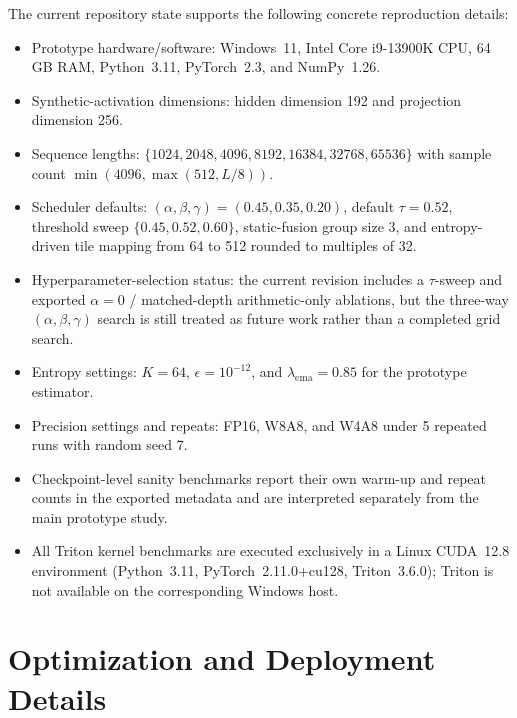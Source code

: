 The current repository state supports the following concrete reproduction details:
\begin{itemize}
  \item Prototype hardware/software: Windows~11, Intel Core i9-13900K CPU, 64\,GB RAM, Python~3.11, PyTorch~2.3, and NumPy~1.26.
  \item Synthetic-activation dimensions: hidden dimension 192 and projection dimension 256.
  \item Sequence lengths: \(\{1024, 2048, 4096, 8192, 16384, 32768, 65536\}\) with sample count \(\min(4096, \max(512, L/8))\).
  \item Scheduler defaults: \((\alpha, \beta, \gamma) = (0.45, 0.35, 0.20)\), default \(\tau = 0.52\), threshold sweep \(\{0.45, 0.52, 0.60\}\), static-fusion group size 3, and entropy-driven tile mapping from 64 to 512 rounded to multiples of 32.
  \item Hyperparameter-selection status: the current revision includes a \(\tau\)-sweep and exported \(\alpha=0\) / matched-depth arithmetic-only ablations, but the three-way \((\alpha,\beta,\gamma)\) search is still treated as future work rather than a completed grid search.
  \item Entropy settings: \(K=64\), \(\epsilon = 10^{-12}\), and \(\lambda_{\mathrm{ema}} = 0.85\) for the prototype estimator.
  \item Precision settings and repeats: FP16, W8A8, and W4A8 under 5 repeated runs with random seed 7.
  \item Checkpoint-level sanity benchmarks report their own warm-up and repeat counts in the exported metadata and are interpreted separately from the main prototype study.
  \item All Triton kernel benchmarks are executed exclusively in a Linux CUDA~12.8 environment (Python~3.11, PyTorch~2.11.0+cu128, Triton~3.6.0); Triton is not available on the corresponding Windows host.
\end{itemize}

\section{Optimization and Deployment Details}
\label{sec:appendix_systems}

